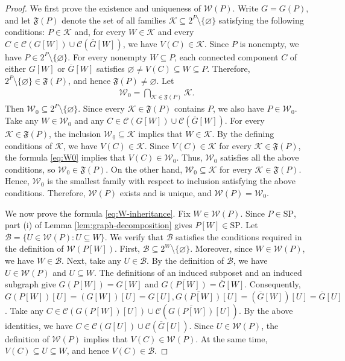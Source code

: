 \documentclass[10pt,a4paper]{amsart}
\begin{document}
\begin{proof}
We first prove the existence and uniqueness of $\mathcal W(P)$.
Write $G=G(P)$, and let $\mathfrak F(P)$ denote the set
of all families $\mathcal K\subseteq 2^P\setminus\{\varnothing\}$
satisfying the following conditions:
$P\in\mathcal K$ and, for every $W\in\mathcal K$ and every
$C\in\mathcal C(G[W])\cup\mathcal C(\overline G[W])$, we have $V(C)\in\mathcal K$.
Since $P$ is nonempty, we have $P\in 2^P\setminus\{\varnothing\}$.
For every nonempty $W\subseteq P$, each connected component $C$
of either $G[W]$ or $\overline G[W]$ satisfies $\varnothing\neq V(C)\subseteq W\subseteq P$.
Therefore, $2^P\setminus\{\varnothing\}\in\mathfrak F(P)$,
and hence $\mathfrak F(P)\neq\varnothing$. Let
\begin{eqnarray}\label{eq:W0}
\mathcal W_0=\bigcap_{\mathcal K\in\mathfrak F(P)}\mathcal K.
\end{eqnarray}
Then $\mathcal W_0\subseteq 2^P\setminus\{\varnothing\}$.
Since every $\mathcal K\in\mathfrak F(P)$ contains $P$,
we also have $P\in\mathcal W_0$.
Take any $W\in\mathcal W_0$ and any $C\in\mathcal C(G[W])\cup\mathcal C(\overline G[W])$.
For every $\mathcal K\in\mathfrak F(P)$,
the inclusion $\mathcal W_0\subseteq\mathcal K$ implies that $W\in\mathcal K$.
By the defining conditions of $\mathcal K$, we have $V(C)\in\mathcal K$.
Since $V(C)\in\mathcal K$ for every
$\mathcal K\in\mathfrak F(P)$, the formula \eqref{eq:W0}
implies that $V(C)\in\mathcal W_0$.
Thus, $\mathcal W_0$ satisfies all the above conditions, so $\mathcal W_0\in\mathfrak F(P)$.
On the other hand, $\mathcal W_0\subseteq\mathcal K$ for every $\mathcal K\in\mathfrak F(P)$.
Hence, $\mathcal W_0$ is the smallest family with respect to inclusion satisfying the above conditions.
Therefore, $\mathcal W(P)$ exists and is unique, and $\mathcal W(P)=\mathcal W_0$.

We now prove the formula \eqref{eq:W-inheritance}.
Fix $W\in\mathcal W(P)$.
Since $P\in\mathrm{SP}$,
part \textup{(i)} of Lemma \ref{lem:graph-decomposition}
gives $P[W]\in\mathrm{SP}$.
Let $\mathcal B=\{U\in\mathcal W(P):U\subseteq W\}$.
We verify that $\mathcal B$ satisfies the conditions required
in the definition of $\mathcal W(P[W])$.
First, $\mathcal B\subseteq 2^W\setminus\{\varnothing\}$.
Moreover, since $W\in\mathcal W(P)$, we have $W\in\mathcal B$.
Next, take any $U\in\mathcal B$.
By the definition of $\mathcal B$, we have $U\in\mathcal W(P)$ and $U\subseteq W$.
The definitions of an induced subposet and an induced subgraph give
$G(P[W])=G[W]$ and $\overline{G(P[W])}=\overline G[W]$.
Consequently, $G(P[W])[U]=(G[W])[U]=G[U],\overline{G(P[W])}[U]=(\overline G[W])[U]=\overline G[U]$.
Take any $C\in\mathcal C(G(P[W])[U])\cup\mathcal C(\overline{G(P[W])}[U])$.
By the above identities, we have $C\in\mathcal C(G[U])\cup\mathcal C(\overline G[U])$.
Since $U\in\mathcal W(P)$, the definition of $\mathcal W(P)$ implies that $V(C)\in\mathcal W(P)$.
At the same time, $V(C)\subseteq U\subseteq W$, and hence $V(C)\in\mathcal B$.


\end{proof}
\end{document}
